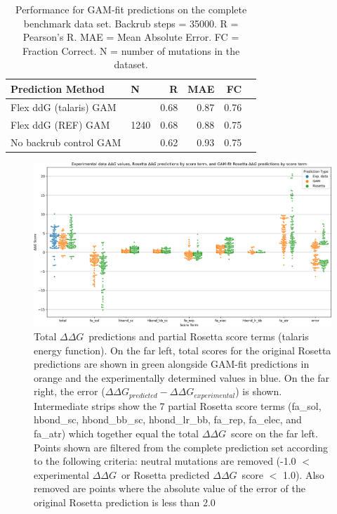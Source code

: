 \documentclass{article}
\newcommand\ddg{$\Delta\Delta G$}
\begin{document}
\begin{table}
  \begin{tabular}{llrrrr}
\toprule
Prediction Method &     N &    R &  MAE &   FC \\
\midrule
 Flex ddG (talaris) GAM & \multirow{ 4}{*}{1240} & 0.68 & 0.87 & 0.76 \\
 Flex ddG (REF) GAM & & 0.68 & 0.88 & 0.75  \\
 No backrub control GAM & & 0.62 & 0.93 & 0.75  \\
\bottomrule
\end{tabular}
  \caption[]{
    Performance for GAM-fit predictions on the complete benchmark data set. Backrub steps = 35000. R = Pearson's R. MAE = Mean Absolute Error. FC = Fraction Correct. N = number of mutations in the dataset.
  } \label{tab:table-gam-fit}
\end{table}

\begin{figure}
  \includegraphics[width=\textwidth,keepaspectratio]{figures/tal_GAM_terms-mpl.png}
  \caption[]{
    Total \ddg\ predictions and partial Rosetta score terms (talaris energy function). On the far left, total scores for the original Rosetta predictions are shown in green alongside GAM-fit predictions in orange and the experimentally determined values in blue. On the far right, the error ($\Delta\Delta G_{predicted} - \Delta\Delta G_{experimental}$) is shown. Intermediate strips show the 7 partial Rosetta score terms (fa\_sol, hbond\_sc, hbond\_bb\_sc, hbond\_lr\_bb, fa\_rep, fa\_elec, and fa\_atr) which together equal the total \ddg\ score on the far left.
    Points shown are filtered from the complete prediction set according to the following criteria: neutral mutations are removed (-1.0 $<$ experimental \ddg\ or Rosetta predicted \ddg\ score $<$ 1.0). Also removed are points where the absolute value of the error of the original Rosetta prediction is less than 2.0
  } \label{fig:tal-GAM-terms-mpl}
\end{figure}
\end{document}
